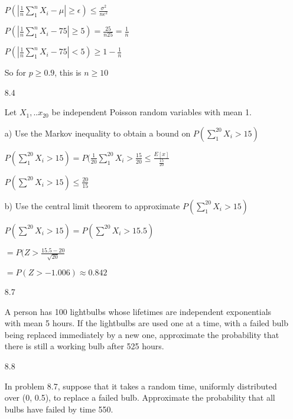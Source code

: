 \documentclass[11pt]{article}
\begin{document}
\begin{itemize}
		$P(|\frac{1}{n} \sum_{1}^{n} X_i
		- \mu| \geq \epsilon) \leq \frac{\sigma^2}{n\epsilon^2}$

		$P(|\frac{1}{n}\sum_{1}^{n} X_i - 75| \geq 5) =
		\frac{25}{n25} = \frac{1}{n}$

		$P(|\frac{1}{n}\sum_{1}^{n} X_i - 75| < 5) \geq
		1 - \frac{1}{n}$

		So for $p \geq 0.9$, this is $n \geq 10$

	\item[8.4]
		
		Let $X_1, ..x_{20}$ be independent Poisson random 
		variables with mean 1.

		a) Use the Markov inequality to obtain a bound on
		$P(\sum_{1}^{20} X_i > 15)$

		$P(\sum_1^{20} X_i > 15) = P(\frac{1}{20}\sum_{1}^{20}X_i
		> \frac{15}{20} \leq \frac{E[x]}{\frac{15}{20}}$

		$P(\sum^{20} X_i > 15) \leq \frac{20}{15}$

		b) Use the central limit theorem to approximate
		$P(\sum_1^{20} X_i > 15)$

		$P(\sum^{20} X_i > 15) = P(\sum^{20} X_i > 15.5)$

		$=P(Z > \frac{15.5-20}{\sqrt{20}}$

		$=P(Z > -1.006) \approx 0.842$

	\item[8.7]

		A person has 100 lightbulbs whose lifetimes are 
		independent exponentials with mean 5 hours.
		If the lightbulbs are used one at a time, with
		a failed bulb being replaced immediately by a new one,
		approximate the probability that there is still a
		working bulb after 525 hours.

	\item[8.8]

		In problem 8.7, suppose that it takes a random time,
		uniformly distributed over (0, 0.5), to replace a 
		failed bulb. Approximate the probability that all bulbs
		have failed by time 550.

\end{itemize}
\end{document}
